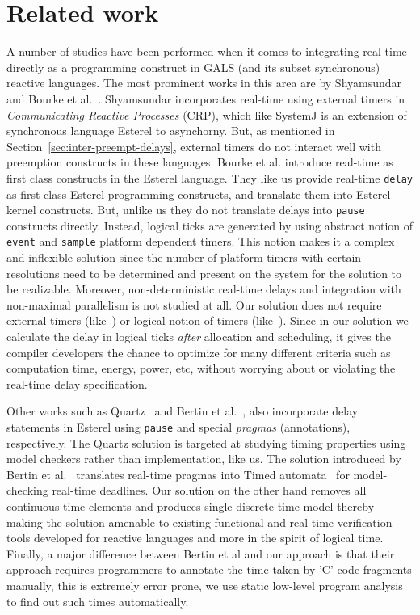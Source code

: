 \section{Related work}
\label{sec:related-work}


A number of studies have been performed when it comes to integrating
real-time directly as a programming construct in GALS (and its subset
synchronous) reactive languages. The most prominent works in this area
are by Shyamsundar~\cite{rsh94} and Bourke et
al.~\cite{Bourke2009a}. Shyamsundar incorporates real-time using
external timers in \textit{Communicating Reactive Processes} (CRP),
which like SystemJ is an extension of synchronous language Esterel to
asynchorny. But, as mentioned in Section~\ref{sec:inter-preempt-delays},
external timers do not interact well with preemption constructs in these
languages. Bourke et al. introduce real-time as first class constructs
in the Esterel language. They like us provide real-time \texttt{delay}
as first class Esterel programming constructs, and translate them into
Esterel kernel constructs. But, unlike us they do not translate delays
into \texttt{pause} constructs directly. Instead, logical ticks are
generated by using abstract notion of \texttt{event} and \texttt{sample}
platform dependent timers. This notion makes it a complex and inflexible
solution since the number of platform timers with certain resolutions
need to be determined and present on the system for the solution to be
realizable. Moreover, non-deterministic real-time delays and integration
with non-maximal parallelism is not studied at all. Our solution does
not require external timers (like~\cite{rsh94}) or logical notion of
timers (like~\cite{Bourke2009a}). Since in our solution we calculate the
delay in logical ticks \textit{after} allocation and scheduling, it
gives the compiler developers the chance to optimize for many different
criteria such as computation time, energy, power, etc, without worrying
about or violating the real-time delay specification. 

Other works such as Quartz~\cite{glog02} and Bertin et
al.~\cite{Bertin:2000:TVR:1947412.1947439}, also incorporate delay
statements in Esterel using \texttt{pause} and special \textit{pragmas}
(annotations), respectively.  The Quartz solution is targeted at
studying timing properties using model checkers rather than
implementation, like us. The solution introduced by Bertin et
al.~\cite{Bertin:2000:TVR:1947412.1947439} translates real-time pragmas
into Timed automata~\cite{alur94} for model-checking real-time
deadlines. Our solution on the other hand removes all continuous time
elements and produces single discrete time model thereby making the
solution amenable to existing functional and real-time verification
tools developed for reactive languages and more in the spirit of logical
time. Finally, a major difference between Bertin et al and our approach
is that their approach requires programmers to annotate the time taken
by 'C' code fragments manually, this is extremely error prone, we use
static low-level program analysis to find out such times automatically.




